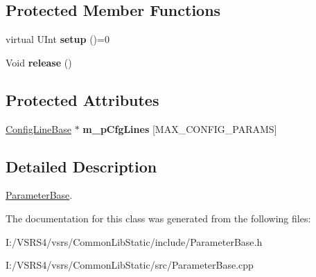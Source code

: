 \subsection*{Protected Member Functions}
\begin{DoxyCompactItemize}
\item 
\mbox{\label{class_parameter_base_adca42e0c992599ac323742a43611c8e3}} 
virtual U\+Int {\bfseries setup} ()=0
\item 
\mbox{\label{class_parameter_base_aae04532a3d349b0d3c8b3cbc8445ad98}} 
Void {\bfseries release} ()
\end{DoxyCompactItemize}
\subsection*{Protected Attributes}
\begin{DoxyCompactItemize}
\item 
\mbox{\label{class_parameter_base_a996eee05301784a58fa6bec9d493d0d0}} 
\hyperlink{class_config_line_base}{Config\+Line\+Base} $\ast$ {\bfseries m\+\_\+p\+Cfg\+Lines} \mbox{[}M\+A\+X\+\_\+\+C\+O\+N\+F\+I\+G\+\_\+\+P\+A\+R\+A\+MS\mbox{]}
\end{DoxyCompactItemize}


\subsection{Detailed Description}
\hyperlink{class_parameter_base}{Parameter\+Base}. 

The documentation for this class was generated from the following files\+:\begin{DoxyCompactItemize}
\item 
I\+:/\+V\+S\+R\+S4/vsrs/\+Common\+Lib\+Static/include/Parameter\+Base.\+h\item 
I\+:/\+V\+S\+R\+S4/vsrs/\+Common\+Lib\+Static/src/Parameter\+Base.\+cpp\end{DoxyCompactItemize}
